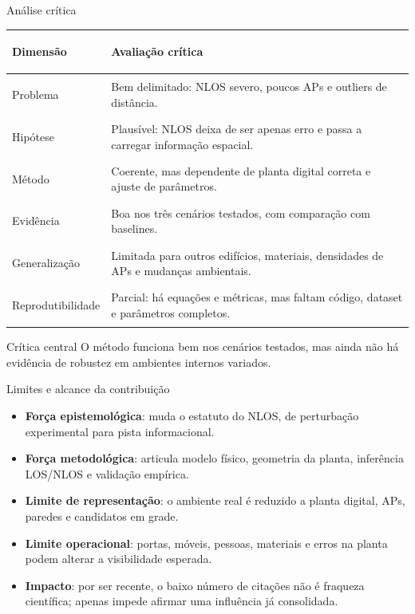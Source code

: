 \documentclass[aspectratio=169,11pt]{beamer}
\begin{document}
\begin{frame}{Análise crítica}
  \footnotesize
  \begin{tabular}{>{\bfseries\raggedright\arraybackslash}p{}>{\raggedright\arraybackslash}p{}}
    \toprule
    Dimensão & Avaliação crítica \\
    \midrule
    Problema & Bem delimitado: NLOS severo, poucos APs e outliers de distância. \\
    Hipótese & Plausível: NLOS deixa de ser apenas erro e passa a carregar informação espacial. \\
    Método & Coerente, mas dependente de planta digital correta e ajuste de parâmetros. \\
    Evidência & Boa nos três cenários testados, com comparação com baselines. \\
    Generalização & Limitada para outros edifícios, materiais, densidades de APs e mudanças ambientais. \\
    Reprodutibilidade & Parcial: há equações e métricas, mas faltam código, dataset e parâmetros completos. \\
    \bottomrule
  \end{tabular}

  \vspace{0.15cm}
  \begin{block}{Crítica central}
    O método funciona bem nos cenários testados, mas ainda não há evidência de robustez em ambientes internos variados.
  \end{block}
\end{frame}

\begin{frame}{Limites e alcance da contribuição}
  \footnotesize
  \begin{itemize}
    \item \textbf{Força epistemológica}: muda o estatuto do NLOS, de perturbação experimental para pista informacional.
    \item \textbf{Força metodológica}: articula modelo físico, geometria da planta, inferência LOS/NLOS e validação empírica.
    \item \textbf{Limite de representação}: o ambiente real é reduzido a planta digital, APs, paredes e candidatos em grade.
    \item \textbf{Limite operacional}: portas, móveis, pessoas, materiais e erros na planta podem alterar a visibilidade esperada.
    \item \textbf{Impacto}: por ser recente, o baixo número de citações não é fraqueza científica; apenas impede afirmar uma influência já consolidada.
  \end{itemize}
\end{frame}
\end{document}
